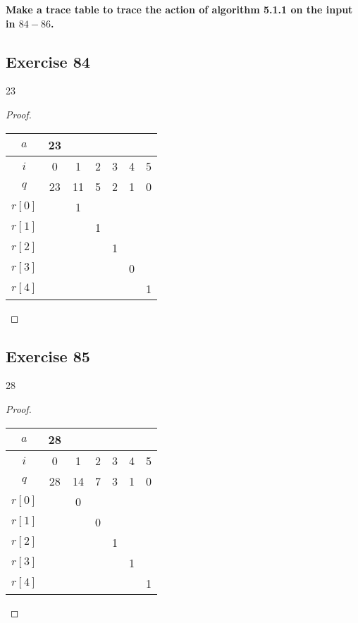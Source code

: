 \documentclass[14pt]{extarticle}
\newcommand{\cy}{\color{cyan}}
\begin{document}
{\bf\cy Make a trace table to trace the action of algorithm 5.1.1 on the input in $84-86$.}

\subsection{Exercise 84}
23
\begin{proof}
\begin{center}
\begin{tabular}{|c|c|c|c|c|c|c|}
\hline
$a$&23&&&&& \\
\hline
$i$&0&1&2&3&4&5 \\
\hline
$q$&23&11&5&2&1&0 \\
\hline
$r[0]$&&1&&&& \\
\hline
$r[1]$&&&1&&& \\
\hline
$r[2]$&&&&1&& \\
\hline
$r[3]$&&&&&0& \\
\hline
$r[4]$&&&&&&1 \\
\hline
\end{tabular}
\end{center}
\end{proof}

\subsection{Exercise 85}
28
\begin{proof}
\begin{center}
\begin{tabular}{|c|c|c|c|c|c|c|}
\hline
$a$&28&&&&& \\
\hline
$i$&0&1&2&3&4&5 \\
\hline
$q$&28&14&7&3&1&0 \\
\hline
$r[0]$&&0&&&& \\
\hline
$r[1]$&&&0&&& \\
\hline
$r[2]$&&&&1&& \\
\hline
$r[3]$&&&&&1& \\
\hline
$r[4]$&&&&&&1 \\
\hline
\end{tabular}
\end{center}
\end{proof}
\end{document}
